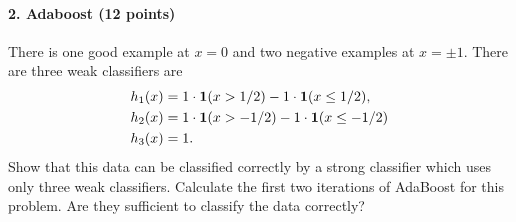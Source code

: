 \documentclass{article}
\begin{document}
\paragraph{2. Adaboost (12 points)} There is one good example at $x=0$ and two negative examples at $x = \pm 1$. There are three weak classifiers are
\begin{align*}
	h_1(x) & = 1\cdot{\bf1}(x > 1/2) -1\cdot{\bf1}(x \leq 1/2),\\
	h_2(x) & = 1\cdot{\bf1}(x > -1/2) -1\cdot{\bf1}(x \leq -1/2)\\
	h_3(x) & =1.
\end{align*}
Show that this data can be classified correctly by a strong classifier which uses only three weak classifiers. Calculate the first two iterations of AdaBoost for this problem. Are they sufficient to classify the data correctly?
\end{document}
